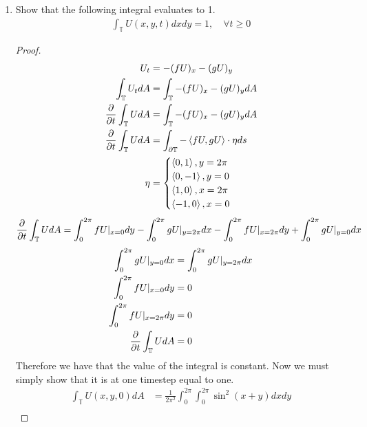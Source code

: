 \documentclass{article}
\begin{document}
\begin{enumerate}[label=\alph*)]

    \item Show that the following integral evaluates to 1. 
    \begin{align*}
        \int_{\mathbb{T}} U(x,y,t)dxdy = 1,\quad  \forall t \ge 0
    \end{align*}
    \begin{proof}
        \begin{align*}
            U_t &= -(fU)_x - (gU)_y \\
            \int_{\mathbb{T}} U_t dA &= \int_{\mathbb{T}}-(fU)_x - (gU)_y dA\\
            \frac{\partial }{\partial t}\int_{\mathbb{T}} U dA &= \int_{\mathbb{T}}-(fU)_x - (gU)_y dA\\
            \frac{\partial }{\partial t}\int_{\mathbb{T}} U dA &= \int_{\partial\mathbb{T}} -\left<fU,
            gU\right>\cdot \eta ds\\
            \eta &= 
            \begin{cases}
                \left<0,1\right>, y = 2\pi\\
                \left<0,-1\right>, y = 0\\
                \left<1,0\right>, x = 2\pi\\
                \left<-1,0\right>, x = 0
            \end{cases}
        \end{align*}
        \begin{align*}
            \frac{\partial }{\partial t}\int_{\mathbb{T}} U dA &= \int_0^{2\pi} fU|_{x=0} dy
            - \int_0^{2\pi} gU|_{y=2\pi} dx 
            - \int_0^{2\pi} fU|_{x=2\pi} dy
            + \int_0^{2\pi} gU|_{y=0} dx \\
        \end{align*}
        \begin{align*}
            \int_0^{2\pi} gU|_{y=0} dx &= \int_0^{2\pi} gU|_{y=2\pi} dx\\
            \int_0^{2\pi} fU|_{x=0} dy &= 0 \\
            \int_0^{2\pi} fU|_{x=2\pi} dy &= 0\\ 
            \frac{\partial }{\partial t}\int_{\mathbb{T}} U dA &= 0 
        \end{align*}
        Therefore we have that the value of the integral is constant. Now we
        must simply show that it is at one timestep equal to one. 
        \begin{align*}
            \int_{\mathbb{T}} U(x,y,0) dA &=
            \frac{1}{2\pi^2}\int_0^{2\pi}\int_0^{2\pi} \sin^2(x+y)dxdy\\

\end{align*}
\end{proof}
\end{enumerate}
\end{document}
